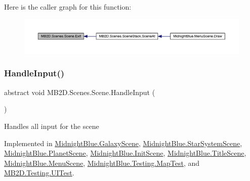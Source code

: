 Here is the caller graph for this function\+:\nopagebreak
\begin{figure}[H]
\begin{center}
\leavevmode
\includegraphics[width=350pt]{class_m_b2_d_1_1_scenes_1_1_scene_a099b79e16d23b67349847999d2336813_icgraph}
\end{center}
\end{figure}
\hypertarget{class_m_b2_d_1_1_scenes_1_1_scene_a476de5a885408d27ff151044d20738c8}{}\label{class_m_b2_d_1_1_scenes_1_1_scene_a476de5a885408d27ff151044d20738c8} 
\subsubsection{\texorpdfstring{Handle\+Input()}{HandleInput()}}
{\footnotesize\ttfamily abstract void M\+B2\+D.\+Scenes.\+Scene.\+Handle\+Input (\begin{DoxyParamCaption}{ }\end{DoxyParamCaption})\hspace{0.3cm}{\ttfamily [pure virtual]}}



Handles all input for the scene 



Implemented in \hyperlink{class_midnight_blue_1_1_galaxy_scene_afd7f8c9f6d0cf6ded10299d4b0015c29}{Midnight\+Blue.\+Galaxy\+Scene}, \hyperlink{class_midnight_blue_1_1_star_system_scene_a9fd64901322082a4da8658650257163d}{Midnight\+Blue.\+Star\+System\+Scene}, \hyperlink{class_midnight_blue_1_1_planet_scene_a6c84a639f27b9f7510b514969d47d1bd}{Midnight\+Blue.\+Planet\+Scene}, \hyperlink{class_midnight_blue_1_1_init_scene_a4a8d9c22193d334e41685ce62fa11dd9}{Midnight\+Blue.\+Init\+Scene}, \hyperlink{class_midnight_blue_1_1_title_scene_a54dc02f150eb90dac2fcc6e37a077723}{Midnight\+Blue.\+Title\+Scene}, \hyperlink{class_midnight_blue_1_1_menu_scene_a34d30a2b66e9eadbf0889071bca6fa57}{Midnight\+Blue.\+Menu\+Scene}, \hyperlink{class_midnight_blue_1_1_testing_1_1_map_test_ad7e54e4aec415ccf6e89ce8a8876d259}{Midnight\+Blue.\+Testing.\+Map\+Test}, and \hyperlink{class_m_b2_d_1_1_testing_1_1_u_i_test_abfdabac63f2f6dd07e49c181ce84b24d}{M\+B2\+D.\+Testing.\+U\+I\+Test}.

